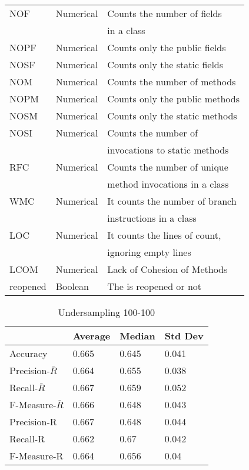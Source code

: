 \documentclass[sigconf,review]{acmart}
\begin{document}
\begin{table}[h]
\begin{tabular}{lll}
NOF &Numerical& Counts the number of fields \\&&in a class\\

NOPF&Numerical& Counts only the public fields\\

NOSF&Numerical& Counts only the static fields \\

NOM &Numerical& Counts the number of methods \\

NOPM &Numerical& Counts only the public methods \\

NOSM &Numerical& Counts only the static methods \\

NOSI &Numerical& Counts the number of \\&& invocations to static methods\\

RFC &Numerical& Counts the number of unique \\&&method invocations in a class\\

WMC &Numerical& It counts the number of branch \\&&instructions in a class\\

LOC &Numerical& It counts the lines of count, \\&&ignoring empty lines\\

LCOM &Numerical&Lack of Cohesion of Methods \\

   reopened 			 & Boolean &  The is reopened or not\\
  

\hline
\hline
\end{tabular}
\end{table}


	\begin{table}[h]
	\caption{Undersampling 100-100} \label{table:undersampling100}

		\begin{tabular}{llll}
		\hline
		\hline
		\multicolumn{1}{c}{}
		& \multicolumn{1}{c}{Average}
		&	\multicolumn{1}{c}{Median}        
		& 	\multicolumn{1}{c}{Std Dev}\\
		\hline
		Accuracy      & 0.665 & 0.645 & 0.041     \\
		\hline
		Precision-$\bar{R}$  &0.664 	&0.655 	& 0.038       \\
		Recall-$\bar{R}$ 	&0.667 	&0.659  &0.052\\
		F-Measure-$\bar{R}$    & 0.666	&0.648 	&0.043      \\
		\hline
		Precision-R          & 0.667	&0.648	&0.044 \\
		Recall-R & 0.662 & 0.67 &0.042 \\
		F-Measure-R    & 0.664	&0.656 	&0.04\\
		\hline
		\end{tabular}

	\end{table}
	
\end{document}
